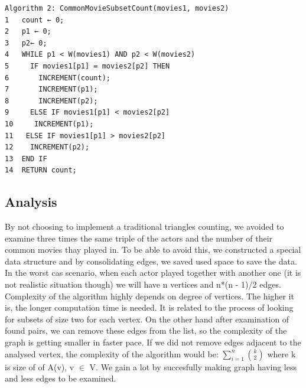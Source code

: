 \begin{verbatim}
Algorithm 2: CommonMovieSubsetCount(movies1, movies2)
1	count ← 0;
2	p1 ← 0;
3	p2← 0;
4	WHILE p1 < W(movies1) AND p2 < W(movies2)
5	  IF movies1[p1] = movies2[p2] THEN
6	    INCREMENT(count);
7	    INCREMENT(p1);
8	    INCREMENT(p2);
9	  ELSE IF movies1[p1] < movies2[p2]
10	   INCREMENT(p1);
11	 ELSE IF movies1[p1] > movies2[p2]
12	  INCREMENT(p2);
13	END IF
14	RETURN count;
\end{verbatim}

\subsection{Analysis}
By not choosing to implement a traditional triangles counting, we avoided to examine three times the same triple of the actors and the number of their common movies thay played in. To be able to avoid this, we constructed a special data structure and by consolidating edges, we saved used space to save the data.
In the worst cas scenario, when each actor played together with another one (it is not realistic situation though) we will have n vertices and n*(n - 1)/2 edges.
\\
Complexity of the algorithm highly depends on degree of vertices. The higher it is, the longer computation time is needed. It is related to the process of looking for subsets of size two for each vertex. On the other hand after examination of found pairs, we can remove these edges from the list, so the complexity of the graph is getting smaller in faster pace. If we did not remove edges adjacent to the analysed vertex, the complexity of the algorithm would be:  \(\sum\limits_{i=1}^n{k \choose 2}\) where k is size of of A(v), v \(\in\) V. We gain a lot by succesfully making graph having less and less edges to be examined.
